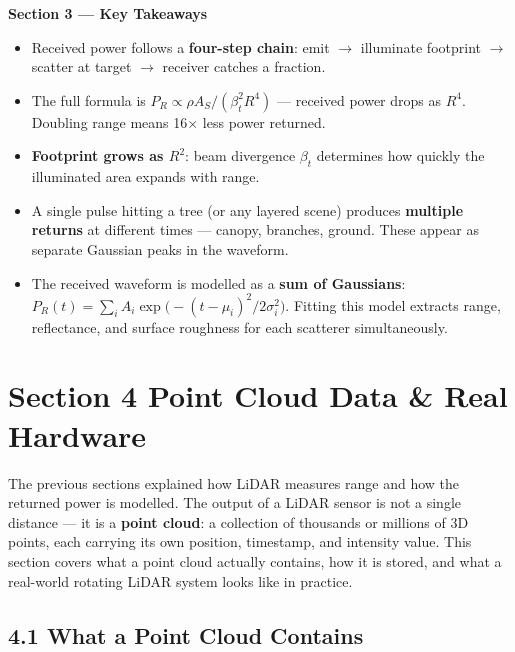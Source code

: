 \documentclass[12pt, a4paper]{article}
\begin{document}
\begin{keybox}
  \textbf{Section 3 --- Key Takeaways}
  \begin{itemize}[leftmargin=1.2em,itemsep=2pt]
    \item Received power follows a \textbf{four-step chain}: emit
      $\to$ illuminate footprint $\to$ scatter at target $\to$ receiver
      catches a fraction.
    \item The full formula is
      $P_R \propto \rho A_S / (\beta_t^2 R^4)$ ---
      received power drops as $R^4$.
      Doubling range means 16$\times$ less power returned.
    \item \textbf{Footprint grows as $R^2$}: beam divergence $\beta_t$
      determines how quickly the illuminated area expands with range.
    \item A single pulse hitting a tree (or any layered scene) produces
      \textbf{multiple returns} at different times --- canopy, branches,
      ground.  These appear as separate Gaussian peaks in the waveform.
    \item The received waveform is modelled as a
      \textbf{sum of Gaussians}:
      $P_R(t) = \sum_i A_i \exp\!\bigl(-(t-\mu_i)^2 / 2\sigma_i^2\bigr)$.
      Fitting this model extracts range, reflectance, and surface roughness
      for each scatterer simultaneously.
  \end{itemize}
\end{keybox}

\newpage
\section*{Section 4 \quad Point Cloud Data \& Real Hardware}

The previous sections explained how LiDAR measures range and how the
returned power is modelled.
The output of a LiDAR sensor is not a single distance --- it is a
\textbf{point cloud}: a collection of thousands or millions of 3D points,
each carrying its own position, timestamp, and intensity value.
This section covers what a point cloud actually contains, how it is stored,
and what a real-world rotating LiDAR system looks like in practice.

\subsection*{4.1 \quad What a Point Cloud Contains}
\end{document}
